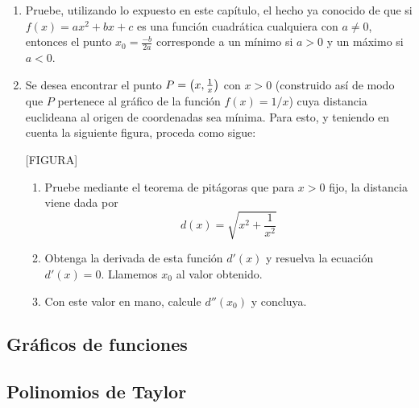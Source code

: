 \begin{enumerate}
    \item Pruebe, utilizando lo expuesto en este capítulo, el hecho ya conocido de que si $f(x) = ax^2 + bx + c$ es una función cuadrática cualquiera con $a \neq 0$, entonces el punto $x_0 = \frac{-b}{2a}$ corresponde a un mínimo si $a > 0$ y un máximo si $a < 0$.
    \item Se desea encontrar el punto $P = \qty(x, \frac{1}{x})$ con $x > 0$ (construido así de modo que $P$ pertenece al gráfico de la función $f(x) = 1/x$) cuya distancia euclideana al origen de coordenadas sea mínima. Para esto, y teniendo en cuenta la siguiente figura, proceda como sigue:
    
    [FIGURA]
    \begin{enumerate}
        \item Pruebe mediante el teorema de pitágoras que para $x > 0$ fijo, la distancia viene dada por
        \[d(x) = \sqrt{x^2 + \frac{1}{x^2}}\]
        \item Obtenga la derivada de esta función $d'(x)$ y resuelva la ecuación $d'(x) = 0$. Llamemos $x_0$ al valor obtenido.
        \item Con este valor en mano, calcule $d''(x_0)$ y concluya.
    \end{enumerate}
\end{enumerate}

\subsection{Gráficos de funciones}

\subsection{Polinomios de Taylor}